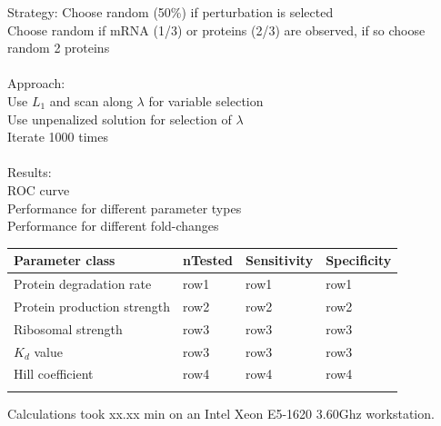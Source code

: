 \documentclass{bioinfo}
\begin{document}
Strategy: Choose random (50\%) if perturbation is selected\\
Choose random if mRNA (1/3) or proteins (2/3) are observed, if so choose random 2 proteins\\ \\
Approach:\\
Use $L_1$ and scan along $\lambda$ for variable selection\\
Use unpenalized solution for selection of $\lambda$\\
Iterate 1000 times\\ \\
Results:\\
ROC curve\\
Performance for different parameter types\\
Performance for different fold-changes

\begin{table}[!t]
 {\begin{tabular}{@{}llll@{}}\toprule Parameter class &
nTested & Sensitivity & Specificity\\\midrule
Protein degradation rate & row1 & row1 & row1\\
Protein production strength & row2 & row2 & row2\\
Ribosomal strength & row3 & row3 & row3\\
$K_d$ value & row3 & row3 & row3\\
Hill coefficient & row4 & row4 & row4\\\botrule
\end{tabular}}{Calculations took xx.xx min on an Intel Xeon E5-1620 3.60Ghz workstation.}
\end{table}


%
%
\end{document}

